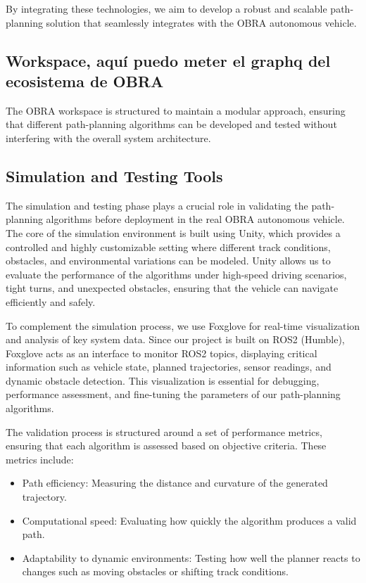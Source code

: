 \documentclass[a4paper,11pt]{report}
\begin{document}
By integrating these technologies, we aim to develop a robust and scalable path-planning solution that seamlessly integrates with the OBRA autonomous vehicle.

\subsection{Workspace, aquí puedo meter el graphq del ecosistema de OBRA}
The OBRA workspace is structured to maintain a modular approach, ensuring that different path-planning algorithms can be developed and tested without interfering with the overall system architecture.

\subsection{Simulation and Testing Tools}

The simulation and testing phase plays a crucial role in validating the path-planning algorithms before deployment in the real OBRA autonomous vehicle. The core of the simulation environment is built using Unity, which provides a controlled and highly customizable setting where different track conditions, obstacles, and environmental variations can be modeled. Unity allows us to evaluate the performance of the algorithms under high-speed driving scenarios, tight turns, and unexpected obstacles, ensuring that the vehicle can navigate efficiently and safely.

To complement the simulation process, we use Foxglove for real-time visualization and analysis of key system data. Since our project is built on ROS2 (Humble), Foxglove acts as an interface to monitor ROS2 topics, displaying critical information such as vehicle state, planned trajectories, sensor readings, and dynamic obstacle detection. This visualization is essential for debugging, performance assessment, and fine-tuning the parameters of our path-planning algorithms.

The validation process is structured around a set of performance metrics, ensuring that each algorithm is assessed based on objective criteria. These metrics include:
\begin{itemize}
    \item Path efficiency: Measuring the distance and curvature of the generated trajectory.
    \item Computational speed: Evaluating how quickly the algorithm produces a valid path.
    \item Adaptability to dynamic environments: Testing how well the planner reacts to changes such as moving obstacles or shifting track conditions.
\end{itemize}
\end{document}
